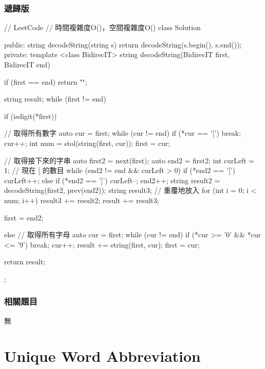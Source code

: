 \subsubsection{遞歸版}
\begin{Code}
// LeetCode
// 時間複雜度O()，空間複雜度O()
class Solution {
public:
    string decodeString(string s) {
        return decodeString(s.begin(), s.end());
    }
private:
    template <class BidirecIT>
        string decodeString(BidirecIT first, BidirecIT end)
    {
        if (first == end) return "";

        string result;
        while (first != end)
        {
            if (isdigit(*first))
            {
                // 取得所有數字
                auto cur = first;
                while (cur != end) { if (*cur == '[') break; cur++; }
                int num = stol(string(first, cur));
                first = cur;

                // 取得接下來的字串
                auto first2 = next(first);
                auto end2 = first2;
                int curLeft = 1; // 現在 [ 的數目
                while (end2 != end && curLeft > 0)
                {
                    if (*end2 == '[')
                        curLeft++;
                    else if (*end2 == ']')
                        curLeft--;
                    end2++;
                }
                string result2 = decodeString(first2, prev(end2));
                string result3;
                // 重覆地放入
                for (int i = 0; i < num; i++)
                    result3 += result2;
                result += result3;

                first = end2;
            }
            else
            {
                // 取得所有字母
                auto cur = first;
                while (cur != end) { if (*cur >= '0' && *cur <= '9') break; cur++; }
                result += string(first, cur);
                first = cur;
            }
        }
        return result;
    }
};
\end{Code}


\subsubsection{相關題目}
\begindot
\item 無
\myenddot

\section{Unique Word Abbreviation} %
\label{sec:unique-word-abbreviation}


